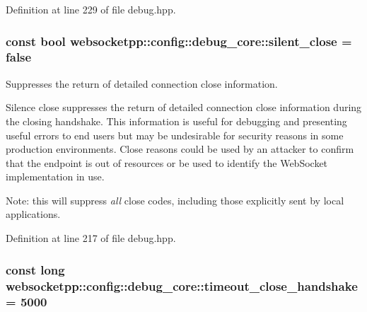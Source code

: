 Definition at line 229 of file debug.\+hpp.

\hypertarget{structwebsocketpp_1_1config_1_1debug__core_a961630bca024033059ef50863d1fc174}{}
\subsubsection[{silent\+\_\+close}]{\setlength{\rightskip}{0pt plus 5cm}const bool websocketpp\+::config\+::debug\+\_\+core\+::silent\+\_\+close = false\hspace{0.3cm}{\ttfamily [static]}}\label{structwebsocketpp_1_1config_1_1debug__core_a961630bca024033059ef50863d1fc174}


Suppresses the return of detailed connection close information. 

Silence close suppresses the return of detailed connection close information during the closing handshake. This information is useful for debugging and presenting useful errors to end users but may be undesirable for security reasons in some production environments. Close reasons could be used by an attacker to confirm that the endpoint is out of resources or be used to identify the Web\+Socket implementation in use.

Note\+: this will suppress {\itshape all} close codes, including those explicitly sent by local applications. 

Definition at line 217 of file debug.\+hpp.

\hypertarget{structwebsocketpp_1_1config_1_1debug__core_abb65f538323f3f7c58378d973fd7dcec}{}
\subsubsection[{timeout\+\_\+close\+\_\+handshake}]{\setlength{\rightskip}{0pt plus 5cm}const long websocketpp\+::config\+::debug\+\_\+core\+::timeout\+\_\+close\+\_\+handshake = 5000\hspace{0.3cm}{\ttfamily [static]}}\label{structwebsocketpp_1_1config_1_1debug__core_abb65f538323f3f7c58378d973fd7dcec}


